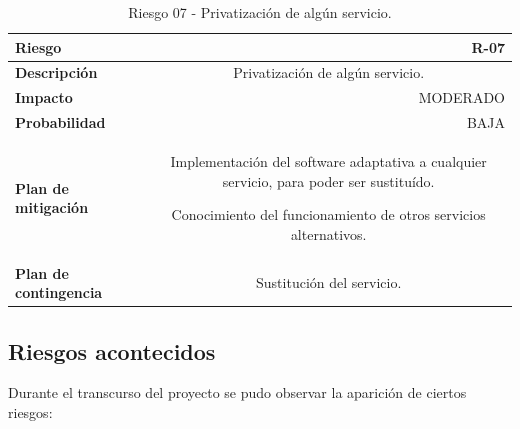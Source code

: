         \begin{table}[H]
        \centering
        \begin{tabular}{|l|c}
        \hline
        \textbf{Riesgo}               & \multicolumn{1}{r|}{R-07}                                             \\ \hline
        \textbf{Descripción}          & \multicolumn{1}{X|}{Privatización de algún servicio.}
        \\ \hline
        \textbf{Impacto}              & \multicolumn{1}{r|}{MODERADO}                                             \\ \hline
        \textbf{Probabilidad}         & \multicolumn{1}{r|}{BAJA}                                         \\ \hline
        \textbf{Plan de mitigación}   & \multicolumn{1}{X|}{ Implementación del software adaptativa a cualquier servicio, para poder ser sustituído.
        
        Conocimiento del funcionamiento de otros servicios alternativos. }
        \\ \hline
        \textbf{Plan de contingencia} & \multicolumn{1}{X|}{ Sustitución del servicio.}
        \\ \hline
        \end{tabular}
        \caption{Riesgo 07 - Privatización de algún servicio. }
        \label{table:riskpriv}
        \end{table}


    \newpage
    \subsection{Riesgos acontecidos}
    
        Durante el transcurso del proyecto se pudo observar la aparición de ciertos riesgos:
        
